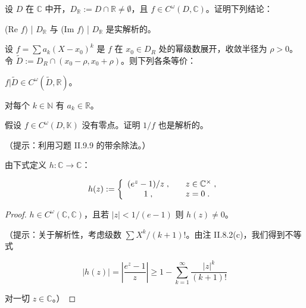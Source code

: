 \begin{exercises}
\item

设 $D$ 在 $\mathbb{C}$ 中开，$D_{\mathbb{R}} := D \cap \mathbb{R} \neq \emptyset$，且 $f \in C^\omega(D, \mathbb{C})$。证明下列结论：

\begin{items}
\item

(Re $f$) | $D_{\mathbb{R}}$ 与 (Im $f$) | $D_{\mathbb{R}}$ 是实解析的。

\item

设 $ f = \sum a_k(X - x_0)^k $ 是 $ f $ 在 $ x_0 \in D_R $ 处的幂级数展开，收敛半径为 $ \rho > 0 $。令 $ \widetilde{D} := D_R \cap (x_0 - \rho, x_0 + \rho) $。则下列各条等价：

\end{items}

\begin{subitems}
\item

$ f|\tilde{D} \in C^{\omega}(\tilde{D}, \mathbb{R}) $。

\item

对每个 $ k \in \mathbb{N} $ 有 $ a_k \in \mathbb{R} $。

\end{subitems}

\item

假设 $ f \in C^\omega(D, \mathbb{K}) $ 没有零点。证明 $ 1/f $ 也是解析的。

（提示：利用习题 II.9.9 的带余除法。）

\item

由下式定义 $h: \mathbb{C} \to \mathbb{C}$：

\begin{equation*}
h(z):=\left\{\begin{array}{c l}{(e^{z}-1)/z\;,}&{\quad z\in\mathbb{C}^{\times}\;,}\\ {1\;,}&{\quad z=0\;.}\\ \end{array}\right.
\end{equation*}
\end{exercises}

\begin{proof}

$ h \in C^\omega(\mathbb{C}, \mathbb{C}) $，且若 $ |z| < 1/(e - 1) $ 则 $ h(z) \neq 0 $。

（提示：关于解析性，考虑级数 $ \sum X^k/(k+1)! $。由注 II.8.2(c)，我们得到不等式

\[
|h(z)|=\left|\frac{e^{z}-1}{z}\right|\geq1-\sum_{k=1}^{\infty}\frac{|z|^{k}}{(k+1)!}
\]

对一切 $ z \in \mathbb{C} $。）

\end{proof}

